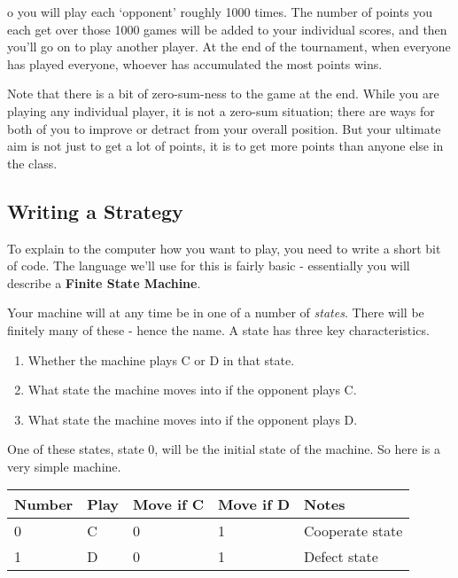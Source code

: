 \documentclass[
  11pt,
]{article}
\providecommand{\tightlist}{%
  \setlength{\itemsep}{0pt}\setlength{\parskip}{0pt}}
\begin{document}
o you will play each `opponent' roughly 1000 times. The number of points
you each get over those 1000 games will be added to your individual
scores, and then you'll go on to play another player. At the end of the
tournament, when everyone has played everyone, whoever has accumulated
the most points wins.

Note that there is a bit of zero-sum-ness to the game at the end. While
you are playing any individual player, it is not a zero-sum situation;
there are ways for both of you to improve or detract from your overall
position. But your ultimate aim is not just to get a lot of points, it
is to get more points than anyone else in the class.

\newpage

\hypertarget{writing-a-strategy}{%
\subsection{Writing a Strategy}\label{writing-a-strategy}}

To explain to the computer how you want to play, you need to write a
short bit of code. The language we'll use for this is fairly basic -
essentially you will describe a \textbf{Finite State Machine}.

Your machine will at any time be in one of a number of \emph{states}.
There will be finitely many of these - hence the name. A state has three
key characteristics.

\begin{enumerate}
\def\labelenumi{\arabic{enumi}.}
\tightlist
\item
  Whether the machine plays C or D in that state.
\item
  What state the machine moves into if the opponent plays C.
\item
  What state the machine moves into if the opponent plays D.
\end{enumerate}

One of these states, state 0, will be the initial state of the machine.
So here is a very simple machine.

\begin{longtable}[]{@{}lllll@{}}
\toprule()
Number & Play & Move if C & Move if D & Notes \\
\midrule()
\endhead
0 & C & 0 & 1 & Cooperate state \\
1 & D & 0 & 1 & Defect state \\
\bottomrule()
\end{longtable}
\end{document}
